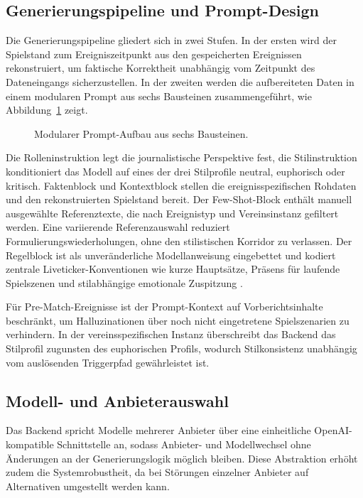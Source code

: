 \subsection{Generierungspipeline und Prompt-Design}\label{generierungspipeline}\label{prompt-engineering-strategie}

Die Generierungspipeline gliedert sich in zwei Stufen. In der ersten wird der Spielstand zum Ereigniszeitpunkt aus den gespeicherten Ereignissen rekonstruiert, um faktische Korrektheit unabhängig vom Zeitpunkt des Dateneingangs sicherzustellen. In der zweiten werden die aufbereiteten Daten in einem modularen Prompt aus sechs Bausteinen zusammengeführt, wie Abbildung~\ref{fig:prompt-aufbau} zeigt.

\begin{figure}[H]
\centering
\DiagramPromptPipeline
\caption[Modularer Aufbau des LLM-Prompts]{Modularer Prompt-Aufbau aus sechs Bausteinen.}
\label{fig:prompt-aufbau}
\end{figure}

Die Rolleninstruktion legt die journalistische Perspektive fest, die Stilinstruktion konditioniert das Modell auf eines der drei Stilprofile neutral, euphorisch oder kritisch. Faktenblock und Kontextblock stellen die ereignisspezifischen Rohdaten und den rekonstruierten Spielstand bereit. Der Few-Shot-Block enthält manuell ausgewählte Referenztexte, die nach Ereignistyp und Vereinsinstanz gefiltert werden. Eine variierende Referenzauswahl reduziert Formulierungswiederholungen, ohne den stilistischen Korridor zu verlassen. Der Regelblock ist als unveränderliche Modellanweisung eingebettet und kodiert zentrale Liveticker-Konventionen wie kurze Hauptsätze, Präsens für laufende Spielszenen und stilabhängige emotionale Zuspitzung \cite{hauser2008, smulczynski2020}.

Für Pre-Match-Ereignisse ist der Prompt-Kontext auf Vorberichtsinhalte beschränkt, um Halluzinationen über noch nicht eingetretene Spielszenarien zu verhindern. In der vereinsspezifischen Instanz überschreibt das Backend das Stilprofil zugunsten des euphorischen Profils, wodurch Stilkonsistenz unabhängig vom auslösenden Triggerpfad gewährleistet ist.

\subsection{Modell- und Anbieterauswahl}\label{multi-provider-architektur}

Das Backend spricht Modelle mehrerer Anbieter über eine einheitliche OpenAI-kompatible Schnittstelle an, sodass Anbieter- und Modellwechsel ohne Änderungen an der Generierungslogik möglich bleiben. Diese Abstraktion erhöht zudem die Systemrobustheit, da bei Störungen einzelner Anbieter auf Alternativen umgestellt werden kann.

